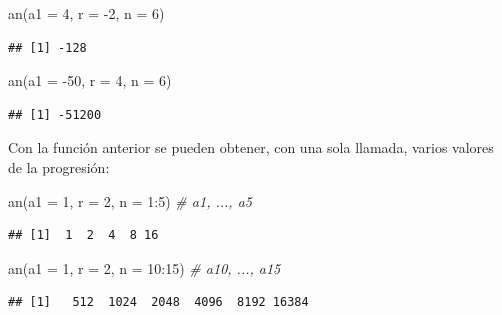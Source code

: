 \documentclass[
]{book}
\newenvironment{Shaded}{\begin{snugshade}}{\end{snugshade}}
\newcommand{\AttributeTok}[1]{\textcolor[rgb]{0.77,0.63,0.00}{#1}}
\newcommand{\CommentTok}[1]{\textcolor[rgb]{0.56,0.35,0.01}{\textit{#1}}}
\newcommand{\DecValTok}[1]{\textcolor[rgb]{0.00,0.00,0.81}{#1}}
\newcommand{\FunctionTok}[1]{\textcolor[rgb]{0.00,0.00,0.00}{#1}}
\newcommand{\NormalTok}[1]{#1}
\newcommand{\SpecialCharTok}[1]{\textcolor[rgb]{0.00,0.00,0.00}{#1}}
\theoremstyle{break}
\theoremstyle{nonumberplain}
\begin{document}
\begin{Shaded}
\begin{Highlighting}[]
\FunctionTok{an}\NormalTok{(}\AttributeTok{a1 =} \DecValTok{4}\NormalTok{, }\AttributeTok{r =} \SpecialCharTok{{-}}\DecValTok{2}\NormalTok{, }\AttributeTok{n =} \DecValTok{6}\NormalTok{)}
\end{Highlighting}
\end{Shaded}

\begin{verbatim}
## [1] -128
\end{verbatim}

\begin{Shaded}
\begin{Highlighting}[]
\FunctionTok{an}\NormalTok{(}\AttributeTok{a1 =} \SpecialCharTok{{-}}\DecValTok{50}\NormalTok{, }\AttributeTok{r =} \DecValTok{4}\NormalTok{, }\AttributeTok{n =} \DecValTok{6}\NormalTok{)}
\end{Highlighting}
\end{Shaded}

\begin{verbatim}
## [1] -51200
\end{verbatim}

Con la función anterior se pueden obtener, con una sola llamada, varios valores de
la progresión:

\begin{Shaded}
\begin{Highlighting}[]
\FunctionTok{an}\NormalTok{(}\AttributeTok{a1 =} \DecValTok{1}\NormalTok{, }\AttributeTok{r =} \DecValTok{2}\NormalTok{, }\AttributeTok{n =} \DecValTok{1}\SpecialCharTok{:}\DecValTok{5}\NormalTok{)    }\CommentTok{\# a1, ..., a5}
\end{Highlighting}
\end{Shaded}

\begin{verbatim}
## [1]  1  2  4  8 16
\end{verbatim}

\begin{Shaded}
\begin{Highlighting}[]
\FunctionTok{an}\NormalTok{(}\AttributeTok{a1 =} \DecValTok{1}\NormalTok{, }\AttributeTok{r =} \DecValTok{2}\NormalTok{, }\AttributeTok{n =} \DecValTok{10}\SpecialCharTok{:}\DecValTok{15}\NormalTok{)  }\CommentTok{\# a10, ..., a15}
\end{Highlighting}
\end{Shaded}

\begin{verbatim}
## [1]   512  1024  2048  4096  8192 16384
\end{verbatim}
\end{document}
